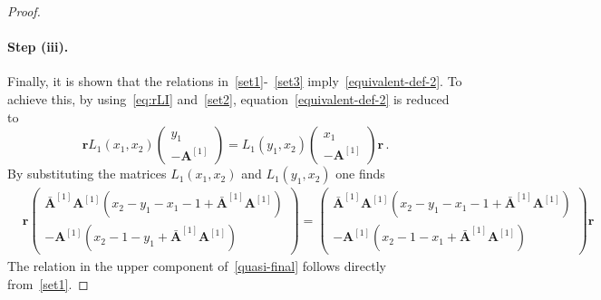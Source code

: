 \documentclass[11pt]{article}
\numberwithin{equation}{section}
\newcommand{\OA}{\mathbf{A}}
\newcommand{\OAD}{\mathbf{\bar{A}}}
\begin{document}
\begin{proof}
\paragraph{Step (iii).}  Finally, it is shown that the relations in~\eqref{set1}-~\eqref{set3} imply~\eqref{equivalent-def-2}.
                                  To achieve this, by using~\eqref{eq:rLI} and~\eqref{set2}, equation~\eqref{equivalent-def-2} is reduced to
\begin{equation}\label{eq:relRLv}
	\mathbf{r}L_{1}(x_{1},x_{2})\begin{pmatrix}
		y_{1}\\
		-\OA^{[1]}
	\end{pmatrix}=L_{1}(y_{1},x_{2})\begin{pmatrix}
		x_{1}\\
		-\OA^{[1]}
	\end{pmatrix}\mathbf{r}\,.
\end{equation}
By substituting the matrices $L_{1}(x_{1},x_{2})$ and $L_{1}(y_{1},x_{2})$ one finds
\begin{equation}\label{quasi-final}
	\begin{split}
		&\mathbf{r}
		\begin{pmatrix}
			\OAD^{[1]}\OA^{[1]}\left(x_{2}-y_{1}-x_{1}-1+\OAD^{[1]}\OA^{[1]}\right)\\
				-\OA^{[1]}\left(x_{2}-1-y_{1}+\OAD^{[1]}\OA^{[1]}\right)
            		\end{pmatrix}=
				\begin{pmatrix}
			\OAD^{[1]}\OA^{[1]}\left(x_{2}-y_{1}-x_{1}-1+\OAD^{[1]}\OA^{[1]}\right)\\
			-\OA^{[1]}\left(x_{2}-1-x_{1}+\OAD^{[1]}\OA^{[1]}\right)
            		\end{pmatrix}\mathbf{r}
	\end{split}
\end{equation}
The relation in the upper
component of~\eqref{quasi-final} follows directly from~\eqref{set1}.






\end{proof}
\end{document}
